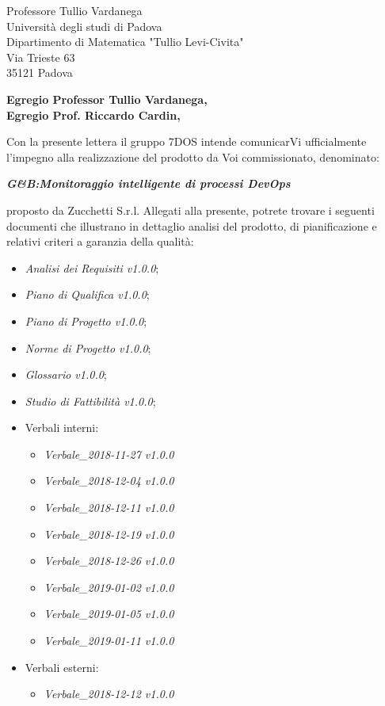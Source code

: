 \begin{letter}{Professore Tullio Vardanega \\ Università degli studi di Padova \\ Dipartimento di Matematica "Tullio Levi-Civita" \\ Via Trieste 63 \\ 35121 Padova}
\opening{\textbf{Egregio Professor Tullio Vardanega,\\Egregio Prof. Riccardo Cardin,}}
\begin{addmargin}[2em]{2em}
  \hspace{1cm} Con la presente lettera il gruppo 7DOS intende comunicarVi ufficialmente l'impegno alla realizzazione del prodotto da Voi commissionato, denominato:
   \singlespacing 
   \centerline{\textbf{\emph{G\&B:Monitoraggio intelligente di processi DevOps}}}
  \singlespacing
  proposto da Zucchetti S.r.l.
  Allegati alla presente, potrete trovare i seguenti documenti che illustrano in dettaglio analisi del prodotto, di pianificazione e relativi criteri a garanzia della qualità:
      \begin{itemize}
	      \item \emph{Analisi dei Requisiti v1.0.0};
	      \item \emph{Piano di Qualifica v1.0.0};
	      \item \emph{Piano di Progetto v1.0.0};
	      \item \emph{Norme di Progetto v1.0.0};
	      \item \emph{Glossario v1.0.0};
	      \item \emph{Studio di Fattibilità v1.0.0};
	      \item Verbali interni:
	            \begin{itemize}
		           	\item \emph{Verbale\_2018-11-27 v1.0.0}
		           	\item \emph{Verbale\_2018-12-04 v1.0.0}
		           	\item \emph{Verbale\_2018-12-11 v1.0.0}
		           	\item \emph{Verbale\_2018-12-19 v1.0.0}
		           	\item \emph{Verbale\_2018-12-26 v1.0.0}
		           	\item \emph{Verbale\_2019-01-02 v1.0.0}
		           	\item \emph{Verbale\_2019-01-05 v1.0.0}
		           	\item \emph{Verbale\_2019-01-11 v1.0.0}
	           	\end{itemize}
		  \item Verbali esterni:
				\begin{itemize}
					\item \emph{Verbale\_2018-12-12 v1.0.0}
				\end{itemize}
	\end{itemize}


\end{addmargin}
\end{letter}
